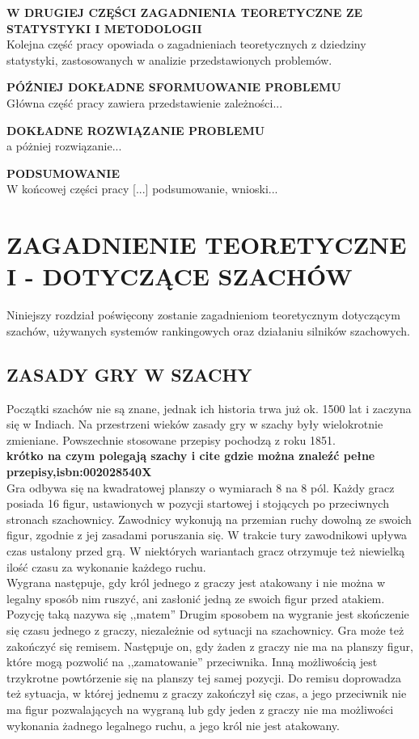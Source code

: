 \documentclass[inzynierska]{pwr_wmat_praca_dyplomowa}
\theoremstyle{plain}
\numberwithin{theorem}{chapter}
\theoremstyle{definition}
\numberwithin{theorem}{chapter}
\begin{document}
\textbf{W DRUGIEJ CZĘŚCI ZAGADNIENIA TEORETYCZNE ZE STATYSTYKI I METODOLOGII}\\
Kolejna część pracy opowiada o zagadnieniach teoretycznych z dziedziny statystyki, zastosowanych w analizie przedstawionych problemów.
 
 
\textbf{PÓŹNIEJ DOKŁADNE SFORMUOWANIE PROBLEMU}\\
Główna część pracy zawiera przedstawienie zależności...

\textbf{DOKŁADNE ROZWIĄZANIE PROBLEMU}\\
a póżniej rozwiązanie...

\textbf{PODSUMOWANIE}\\
W końcowej części pracy [...] podsumowanie, wnioski...

\chapter{ZAGADNIENIE TEORETYCZNE I - DOTYCZĄCE SZACHÓW}
Niniejszy rozdział poświęcony zostanie zagadnieniom teoretycznym dotyczącym szachów, używanych systemów rankingowych oraz działaniu silników szachowych.
\section{ZASADY GRY W SZACHY}
Początki szachów nie są znane, jednak ich historia trwa już ok. 1500 lat i zaczyna się w Indiach. Na przestrzeni wieków zasady gry w szachy były wielokrotnie zmieniane. Powszechnie stosowane przepisy pochodzą z roku 1851.\\

\textbf{krótko na czym polegają szachy i cite gdzie można znaleźć pełne przepisy,isbn:002028540X}\\

Gra odbywa się na kwadratowej planszy o wymiarach 8 na 8 pól. Każdy gracz posiada 16 figur, ustawionych w pozycji startowej i stojących po przeciwnych stronach szachownicy. Zawodnicy wykonują na przemian ruchy dowolną ze swoich figur, zgodnie z jej zasadami poruszania się. W trakcie tury zawodnikowi upływa czas ustalony przed grą. W niektórych wariantach gracz otrzymuje też niewielką ilość czasu za wykonanie każdego ruchu.\\

Wygrana następuje, gdy król jednego z graczy jest atakowany i nie można w legalny sposób nim ruszyć, ani zasłonić jedną ze swoich figur przed atakiem. Pozycję taką nazywa się ,,matem'' Drugim sposobem na wygranie jest skończenie się czasu jednego z graczy, niezależnie od sytuacji na szachownicy. 
Gra może też zakończyć się remisem. Następuje on, gdy żaden z graczy nie ma na planszy figur, które mogą pozwolić na ,,zamatowanie'' przeciwnika. Inną możliwością jest trzykrotne powtórzenie się na planszy tej samej pozycji. Do remisu doprowadza też sytuacja, w której jednemu z graczy zakończył się czas, a jego przeciwnik nie ma figur pozwalających na wygraną lub gdy jeden z graczy nie ma możliwości wykonania żadnego legalnego ruchu, a jego król nie jest atakowany.
\end{document}
